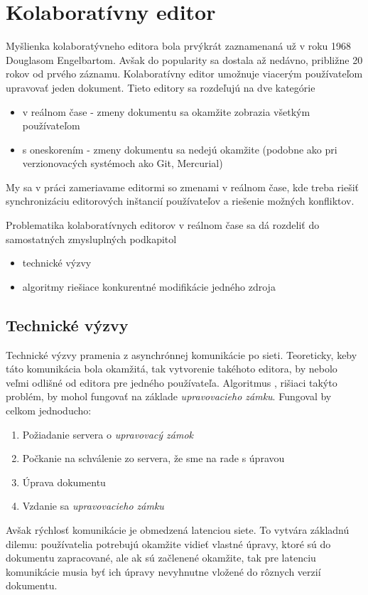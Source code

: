 \chapter{Kolaboratívny editor}

\label{kap:zdialtelnost} %

Myšlienka kolaboratývneho editora bola prvýkrát zaznamenaná už v roku 1968 Douglasom Engelbartom. 
Avšak do popularity sa dostala až nedávno, približne 20 rokov od prvého záznamu.
Kolaboratívny editor umožnuje viacerým používateľom upravovať jeden dokument.
Tieto editory sa rozdeľujú na dve kategórie
\begin{itemize}
  \item v reálnom čase - zmeny dokumentu sa okamžite zobrazia všetkým používateľom
  \item s oneskorením - zmeny dokumentu sa nedejú okamžite (podobne ako pri verzionovacých
  systémoch ako Git, Mercurial)
\end{itemize}
My sa v práci zameriavame editormi so zmenami v reálnom čase, kde treba
riešiť synchronizáciu editorových inštancií používateľov a riešenie možných konfliktov.

Problematika kolaboratívnych editorov v reálnom čase sa dá rozdeliť do samostatných zmysluplných 
podkapitol
\begin{itemize}
\item  technické výzvy
\item  algoritmy riešiace konkurentné modifikácie jedného zdroja
\end{itemize}

\section{Technické výzvy}
Technické výzvy pramenia z asynchrónnej komunikácie po sieti. Teoreticky, keby táto 
komunikácia bola okamžitá, tak vytvorenie takéhoto editora, by nebolo veľmi odlišné od
editora pre jedného používateľa. Algoritmus \label{algo:nesubezne_editovanie}, 
rišiaci takýto problém,  by mohol fungovať na  základe 
\textit{upravovacieho zámku}. Fungoval by celkom jednoducho:
\begin{enumerate}
  \item Požiadanie servera o \textit{upravovacý zámok}
  \item Počkanie na schválenie zo servera, že sme na rade s úpravou
  \item Úprava dokumentu
  \item Vzdanie sa \textit{upravovacieho zámku}
\end{enumerate}
Avšak rýchlosť komunikácie je obmedzená latenciou siete. To vytvára základnú dilemu: 
používatelia potrebujú okamžite vidieť vlastné úpravy, ktoré sú do dokumentu zapracované,
ale ak sú začlenené okamžite, tak pre latenciu komunikácie musia byť ich
úpravy nevyhnutne vložené do rôznych verzií dokumentu.

